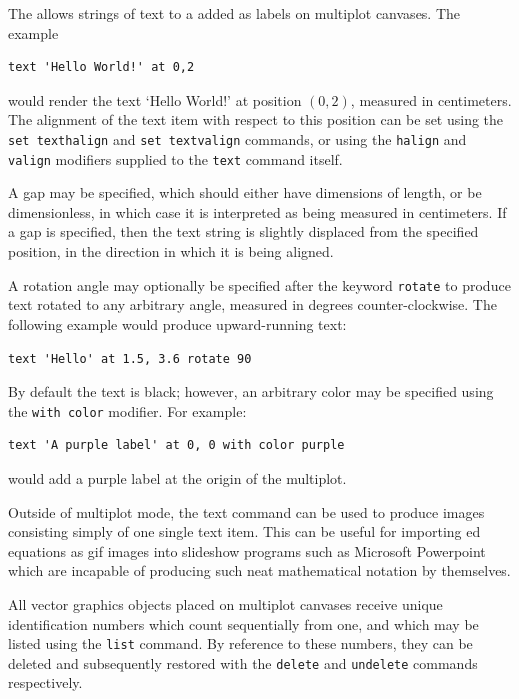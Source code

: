 The  allows strings of text to a added as labels on multiplot
canvases. The example

\begin{verbatim}
text 'Hello World!' at 0,2
\end{verbatim}

\noindent would render the text `Hello World!' at position $(0,2)$, measured in
centimeters. The alignment of the text item with respect to this position can
be set using the {\tt set texthalign} and {\tt set textvalign} commands, or
using the {\tt halign} and {\tt valign} modifiers supplied to the {\tt text}
command itself.

A gap may be specified, which should either have dimensions of length, or be
dimensionless, in which case it is interpreted as being measured in
centimeters. If a gap is specified, then the text string is slightly displaced
from the specified position, in the direction in which it is being aligned.

A rotation angle may optionally be specified after the keyword {\tt rotate}
to produce text rotated to any arbitrary angle, measured in degrees
counter-clockwise. The following example would produce upward-running text:

\begin{verbatim}
text 'Hello' at 1.5, 3.6 rotate 90
\end{verbatim}

By default the text is black; however, an arbitrary color may be specified
using the {\tt with color} modifier.  For example:

\begin{verbatim}
text 'A purple label' at 0, 0 with color purple
\end{verbatim}

\noindent would add a purple label at the origin of the multiplot.

Outside of multiplot mode, the text command can be used to produce images
consisting simply of one single text item. This can be useful for importing
\latexdcf ed equations as gif images into slideshow programs such as Microsoft
Powerpoint which are incapable of producing such neat mathematical notation
by themselves.

All vector graphics objects placed on multiplot canvases receive unique
identification numbers which count sequentially from one, and which may be
listed using the {\tt list} command.  By reference to these numbers, they can
be deleted and subsequently restored with the {\tt delete} and {\tt undelete}
commands respectively.


